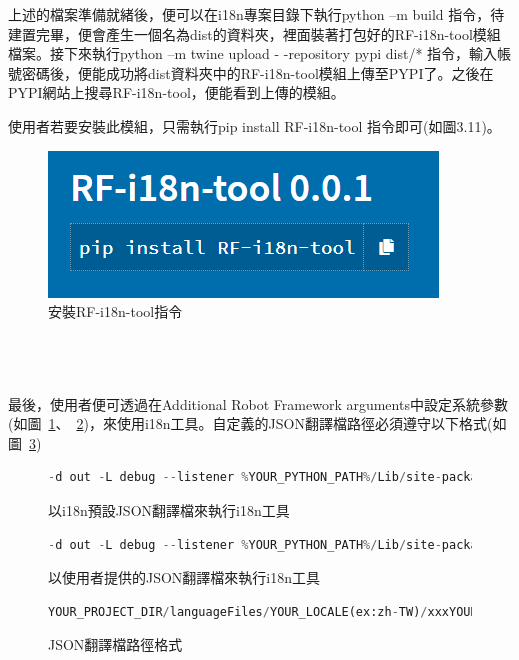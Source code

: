上述的檔案準備就緒後，便可以在i18n專案目錄下執行python –m build 指令，待建置完畢，便會產生一個名為dist的資料夾，裡面裝著打包好的RF-i18n-tool模組檔案。接下來執行python –m twine upload - -repository pypi dist/* 指令，輸入帳號密碼後，便能成功將dist資料夾中的RF-i18n-tool模組上傳至PYPI了。之後在PYPI網站上搜尋RF-i18n-tool，便能看到上傳的模組。

使用者若要安裝此模組，只需執行pip install RF-i18n-tool 指令即可(如圖3.11)。

\begin{figure}[H]
    \centering
    \includegraphics[width= .5\textwidth]{../論文截圖/3-5-8 安裝RF-AWT-i18n指令.png}
    \caption{安裝RF-i18n-tool指令}
\end{figure}

\hspace*{\fill} \\
\\ \hspace*{\fill} \\

最後，使用者便可透過在Additional Robot Framework arguments中設定系統參數(如圖~\ref{以i18n預設JSON翻譯檔來執行i18n工具}、~\ref{以使用者提供的JSON翻譯檔來執行i18n工具})，來使用i18n工具。自定義的JSON翻譯檔路徑必須遵守以下格式(如圖~\ref{JSON翻譯檔路徑格式})

\begin{figure}[H]
\begin{lstlisting}[language={python}]
-d out -L debug --listener %YOUR_PYTHON_PATH%/Lib/site-packages/i18n/listeners/I18nListener.py:YOUR_LOCALE:i18njson
\end{lstlisting}
\caption{以i18n預設JSON翻譯檔來執行i18n工具}
\label{以i18n預設JSON翻譯檔來執行i18n工具}
\end{figure}

\begin{figure}[H]
\begin{lstlisting}[language={python}]
-d out -L debug --listener %YOUR_PYTHON_PATH%/Lib/site-packages/i18n/listeners/I18nListener.py:YOUR_LOCALE
\end{lstlisting}
\caption{以使用者提供的JSON翻譯檔來執行i18n工具}
\label{以使用者提供的JSON翻譯檔來執行i18n工具}
\end{figure}

\begin{figure}[H]
\begin{lstlisting}[language={python}]
YOUR_PROJECT_DIR/languageFiles/YOUR_LOCALE(ex:zh-TW)/xxxYOUR_LOCALE.json
\end{lstlisting}
\caption{JSON翻譯檔路徑格式}
\label{JSON翻譯檔路徑格式}
\end{figure}